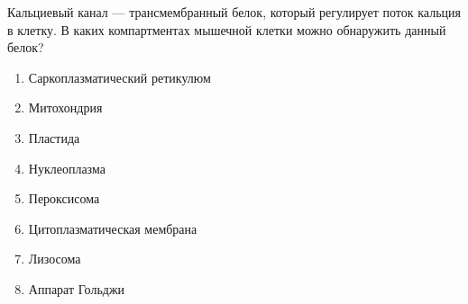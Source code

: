 
Кальциевый канал — трансмембранный белок, который регулирует поток кальция в клетку. В каких
компартментах мышечной клетки можно обнаружить данный белок?

\begin{enumerate}
    \item Саркоплазматический ретикулюм
    \item Митохондрия
    \item Пластида
    \item Нуклеоплазма 
    \item Пероксисома
    \item Цитоплазматическая мембрана
    \item Лизосома
    \item Аппарат Гольджи
\end{enumerate}



